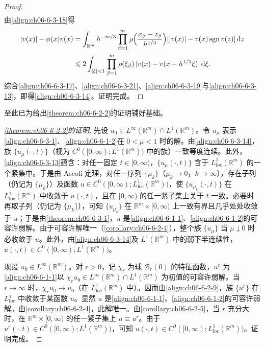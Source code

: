 \documentclass[../../main.tex]{subfiles}
\begin{document}
\begin{proof}
\begin{align}
\label{align:ch06-6-3-20}
\end{align}
由\eqref{align:ch06-6-3-18}得
\begin{align}
|v(x)|-\phi(x)v(x)
&=\int_{\mathbb{R}^{m}}h^{-m/3}\prod_{\beta=1}^{m}\rho\Bigl{(}\frac{x_{\beta}-z_{\beta}}{h^{1/3}}\Bigr{)}[|v(x)|-v(x)\operatorname{sgn}v(z)]\,\mathrm{d}z\notag\\
&\leqslant 2\int_{|\xi|<1}\prod_{\beta=1}^{m}\rho(\xi_{\beta})\,|v(x)-v(x-h^{1/3}\xi)|\,\mathrm{d}\xi.
\label{align:ch06-6-3-21}
\end{align}
综合\eqref{align:ch06-6-3-17}、\eqref{align:ch06-6-3-21}、\eqref{align:ch06-6-3-19}与\eqref{align:ch06-6-3-13}，即得\eqref{align:ch06-6-3-14}。证明完成。
\end{proof}

至此已为给出\cref{theorem:ch06-6-2-2}的证明铺好基础。

\begin{proof}[\cref{theorem:ch06-6-2-2}的证明]
先设 $u_{0}\in L^{\infty}(\mathbb{R}^{m})\cap L^{1}(\mathbb{R}^{m})$。令 $u_{\mu}$ 表示\eqref{align:ch06-6-3-1}、\eqref{align:ch06-6-1-2}在 $0<\mu<1$ 时的解。由\eqref{align:ch06-6-3-14}，族 $\{u_{\mu}(\cdot,t)\}$（视为 $C^{0}([0,\infty);L^{1}(\mathbb{R}^{m}))$ 中的族）一致等度连续。此外，\eqref{align:ch06-6-3-13}蕴含：对任一固定 $t\in[0,\infty)$，$\{u_{\mu}(\cdot,t)\}$ 含于 $L^{1}_{\mathrm{loc}}(\mathbb{R}^{m})$ 的一个紧集中。于是由 Ascoli 定理，对任一序列 $\{\mu_{k}\}$（$\mu_{k}\to 0$，$k\to\infty$），存在子列（仍记为 $\{\mu_{k}\}$）及函数 $u\in C^{0}([0,\infty);L^{1}_{\mathrm{loc}}(\mathbb{R}^{m}))$，使 $\{u_{\mu_{k}}(\cdot,t)\}$ 在 $L^{1}_{\mathrm{loc}}(\mathbb{R}^{m})$ 中收敛于 $u(\cdot,t)$，且在 $[0,\infty)$ 的任一紧子集上关于 $t$ 一致。必要时再取子列（仍记为 $\{\mu_{k}\}$），可知 $\{u_{\mu_{k}}\}$ 在 $\mathbb{R}^{m}\times[0,\infty)$ 上一致有界且几乎处处收敛于 $u$；于是由\cref{theorem:ch06-6-3-1}，$u$ 是\eqref{align:ch06-6-1-1}、\eqref{align:ch06-6-1-2}的可容许弱解。由于可容许解唯一（\cref{corollary:ch06-6-2-4}），整个族 $\{u_{\mu}\}$ 当 $\mu\downarrow 0$ 时必收敛于 $u$。此外，由\eqref{align:ch06-6-3-14}及 $L^{1}(\mathbb{R}^{m})$ 中的弱下半连续性，$u(\cdot,t)\in C^{0}([0,\infty);L^{1}(\mathbb{R}^{m}))$。

现设 $u_{0}\in L^{\infty}(\mathbb{R}^{m})$。对 $r>0$，记 $\chi_{r}$ 为球 $\mathscr{B}_{r}(0)$ 的特征函数，$u^{r}$ 为\eqref{align:ch06-6-1-1}以 $\chi_{r}u_{0}\in L^{\infty}(\mathbb{R}^{m})\cap L^{1}(\mathbb{R}^{m})$ 为初值的可容许弱解。当 $r\to\infty$ 时，$\chi_{r}u_{0}\to u_{0}$（在 $L^{1}_{\mathrm{loc}}(\mathbb{R}^{m})$ 中）。因而由\eqref{align:ch06-6-2-9}，族 $\{u^{r}\}$ 在 $L^{1}_{\mathrm{loc}}$ 中收敛于某函数 $u$。显然 $u$ 是\eqref{align:ch06-6-1-1}、\eqref{align:ch06-6-1-2}的可容许弱解。由\cref{corollary:ch06-6-2-4}，此解唯一。由\cref{corollary:ch06-6-2-5}，当 $r$ 充分大时，在 $\mathbb{R}^{m}\times[0,\infty)$ 的任一紧子集上 $u\equiv u^{r}$。由于 $u^{r}(\cdot,t)\in C^{0}([0,\infty);L^{1}(\mathbb{R}^{m}))$，可知 $u(\cdot,t)\in C^{0}([0,\infty);L^{1}_{\mathrm{loc}}(\mathbb{R}^{m}))$。证明完成。
\end{proof}
\end{document}
